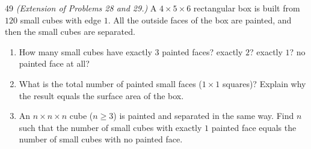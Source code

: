 \begin{probbox}{49}{}
\textit{(Extension of Problems 28 and 29.)} A $4\times 5\times 6$ rectangular box is built from $120$ small cubes with
edge $1$. All the outside faces of the box are painted, and then the small cubes are separated.
\begin{enumerate}[label=\alph*),leftmargin=1.6em,itemsep=1pt]
\item How many small cubes have exactly $3$ painted faces? exactly $2$? exactly $1$? no painted face at all?
\item What is the total number of painted small faces ($1\times 1$ squares)? Explain why the result equals the
surface area of the box.
\item An $n\times n\times n$ cube ($n\ge 3$) is painted and separated in the same way. Find $n$ such that the number
of small cubes with exactly $1$ painted face equals the number of small cubes with no painted face.
\end{enumerate}
\end{probbox}
